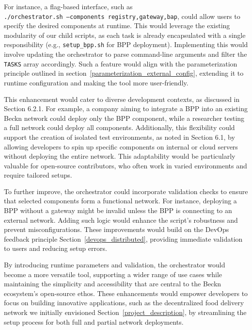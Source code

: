 For instance, a flag-based interface, such as \\
\texttt{./orchestrator.sh --components registry,gateway,bap}, could allow users to specify the desired components at runtime. This would leverage the existing modularity of our child scripts, as each task is already encapsulated with a single responsibility (e.g., \texttt{setup\_bpp.sh} for BPP deployment). Implementing this would involve updating the orchestrator to parse command-line arguments and filter the \texttt{TASKS} array accordingly. Such a feature would align with the parameterization principle outlined in section~\ref{parameterization_external_config}, extending it to runtime configuration and making the tool more user-friendly.

This enhancement would cater to diverse development contexts, as discussed in Section 6.2.1. For example, a company aiming to integrate a BPP into an existing Beckn network could deploy only the BPP component, while a researcher testing a full network could deploy all components. Additionally, this flexibility could support the creation of isolated test environments, as noted in Section 6.1, by allowing developers to spin up specific components on internal or cloud servers without deploying the entire network. This adaptability would be particularly valuable for open-source contributors, who often work in varied environments and require tailored setups.

To further improve, the orchestrator could incorporate validation checks to ensure that selected components form a functional network. For instance, deploying a BPP without a gateway might be invalid unless the BPP is connecting to an external network. Adding such logic would enhance the script's robustness and prevent misconfigurations. These improvements would build on the DevOps feedback principle Section~\ref{devops_distributed}, providing immediate validation to users and reducing setup errors.

By introducing runtime parameters and validation, the orchestrator would become a more versatile tool, supporting a wider range of use cases while maintaining the simplicity and accessibility that are central to the Beckn ecosystem's open-source ethos. These enhancements would empower developers to focus on building innovative applications, such as the decentralized food delivery network we initially envisioned Section~\ref{project_description}, by streamlining the setup process for both full and partial network deployments.